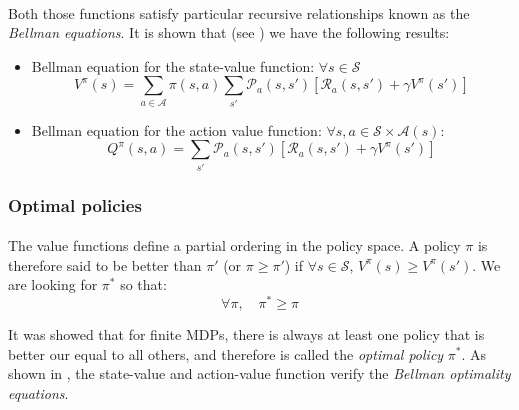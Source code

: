 {{{{				\paragraph{} Both those functions satisfy particular recursive relationships known as the \emph{Bellman equations}. It is shown that (see \cite{sutton1998reinforcement}) we have the following results: 
				\vspace{10pt}
				
				{
					\begin{itemize}[label=$\triangleright$]
						\item Bellman equation for the state-value function: $\forall s \in\mathcal{S}$ 
						\begin{equation}
							V^\pi(s) = \sum_{a\in\mathcal{A}}\pi(s,a)\sum_{s'} \mathcal{P}_a(s,s')\left[\mathcal{R}_a(s,s') + \gamma V^\pi(s')\right]
						\end{equation}
						\item Bellman equation for the action value function: $\forall{s,a}\in\mathcal{S}\times\mathcal{A}(s)$: 
						\begin{equation}
							Q^\pi(s,a) = \sum_{s'}\mathcal{P}_a(s,s')\left[ \mathcal{R}_a(s,s') + \gamma V^\pi(s')\right]
						\end{equation}
					\end{itemize}
				}
			}
			\subsubsection{Optimal policies}
			{
				\paragraph{} The value functions define a partial ordering in the policy space. A policy $\pi$ is therefore said to be better than $\pi'$ (or $\pi\geq \pi'$) if $\forall{s}\in\mathcal{S}$, $V^\pi(s) \geq V^\pi(s')$. We are looking for $\pi^*$ so that: 
				\begin{equation}
					\forall\pi, \quad \pi^* \geq \pi 
				\end{equation}
				
				It was showed that for finite MDPs, there is always at least one policy that is better our equal to all others, and therefore is called the \emph{optimal policy} $\pi^*$. As shown in \cite{sutton1998reinforcement}, the state-value and action-value function verify the \emph{Bellman optimality equations}. 
				
}}}}
